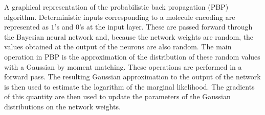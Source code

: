 A graphical representation of the probabilistic back propagation (PBP)
algorithm. Deterministic inputs corresponding to a molecule encoding are represented as $1$'s and $0$'s at the input
layer. These are passed forward through the Bayesian neural network and, because
the network weights are random, the values obtained at the output of the
neurons are also random. The main operation in PBP is the approximation of the
distribution of these random values with a Gaussian by moment matching. These
operations are performed in a forward pass. The resulting Gaussian
approximation to the output of the network is then used to estimate the
logarithm of the marginal likelihood. The gradients of this quantity are then
used to update the parameters of the Gaussian distributions on the network
weights.

